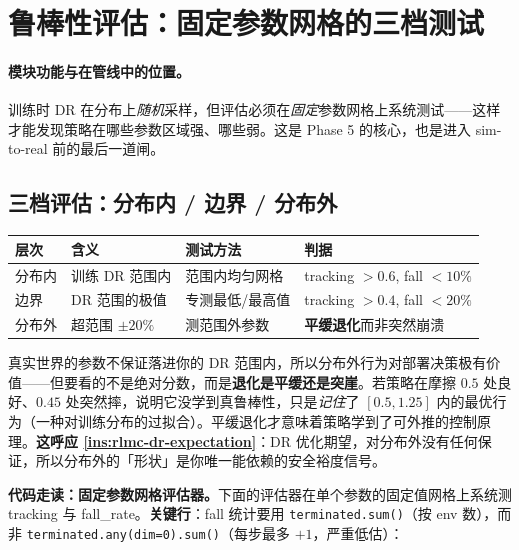 \section{鲁棒性评估：固定参数网格的三档测试}
\label{sec:rlmc-dr-robust}

\paragraph{模块功能与在管线中的位置。}训练时 DR 在分布上\emph{随机}采样，但评估必须在\emph{固定}参数网格上系统测试——这样才能发现策略在哪些参数区域强、哪些弱。这是 Phase 5 的核心，也是进入 sim-to-real 前的最后一道闸。

\subsection{三档评估：分布内 / 边界 / 分布外}
\label{sec:rlmc-dr-robust-3level}

\begin{center}
\small
\begin{tabular}{@{}llll@{}}
\toprule
层次 & 含义 & 测试方法 & 判据 \\
\midrule
分布内 & 训练 DR 范围内 & 范围内均匀网格 & tracking $>0.6$, fall $<10\%$ \\
边界 & DR 范围的极值 & 专测最低/最高值 & tracking $>0.4$, fall $<20\%$ \\
分布外 & 超范围 $\pm 20\%$ & 测范围外参数 & \textbf{平缓退化}而非突然崩溃 \\
\bottomrule
\end{tabular}
\end{center}

\begin{insight}\label{ins:rlmc-dr-ood}
真实世界的参数不保证落进你的 DR 范围内，所以分布外行为对部署决策极有价值——但要看的不是绝对分数，而是\textbf{退化是平缓还是突崖}。若策略在摩擦 $0.5$ 处良好、$0.45$ 处突然摔，说明它没学到真鲁棒性，只是\emph{记住}了 $[0.5,1.25]$ 内的最优行为（一种对训练分布的过拟合）。平缓退化才意味着策略学到了可外推的控制原理。\textbf{这呼应 \cref{ins:rlmc-dr-expectation}}：DR 优化期望，对分布外没有任何保证，所以分布外的「形状」是你唯一能依赖的安全裕度信号。
\end{insight}

\textbf{代码走读：固定参数网格评估器。}下面的评估器在单个参数的固定值网格上系统测 tracking 与 fall\_rate。\textbf{关键行}：fall 统计要用 \verb|terminated.sum()|（按 env 数），而非 \verb|terminated.any(dim=0).sum()|（每步最多 $+1$，严重低估）：

